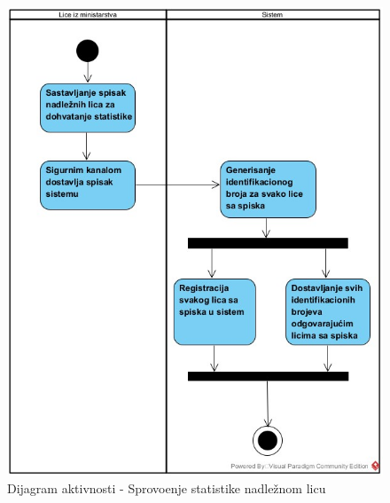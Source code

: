 \documentclass[titlepage]{article}
\begin{document}
\begin{figure}[H]
\includegraphics[scale=0.53]{Dodela_ID_za_dohvatanje_statistike.jpg}
\caption{Dijagram aktivnosti - Sprovo\dj{}enje statistike nadle\v{z}nom licu}
\end{figure}
\end{document}
